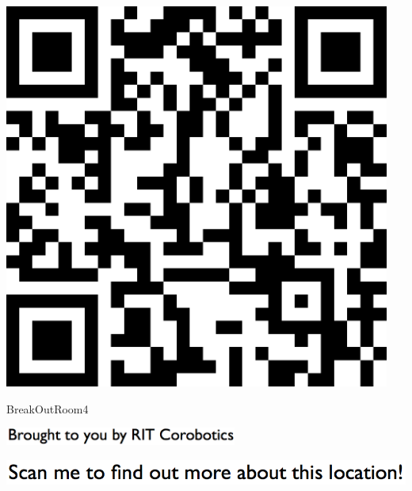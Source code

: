 \documentclass[letterpaper]{article}
\begin{document}
 \begingroup 
 \centerline{\includegraphics[scale=1,width=5in,height=5in]{BreakOutRoom4.png}} 
 \endgroup 
 \vspace*{\fill} 

 \hfill{\small BreakOutRoom4} 

  \vspace{0.7in} 
 
 \centerline{\includegraphics[scale=1,width=3in]{text-bottom.png}} 
 
 \pagebreak 
{} 
 \vspace*{\fill} 
 
  \centerline{\includegraphics[scale=1,width=6in]{text-top.png}} 
 
 \vspace{0.5in} 
 
\end{document}
